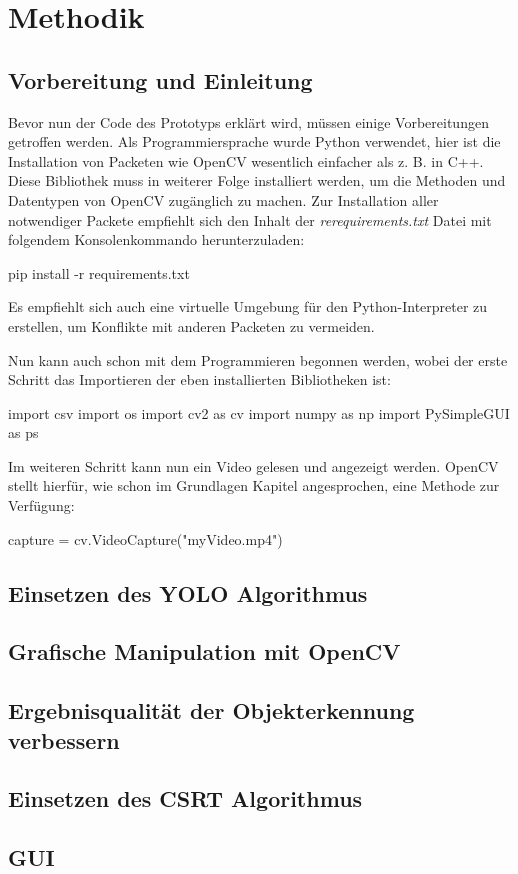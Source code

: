 \chapter{Methodik}
\label{cha:Methodik}

\section{Vorbereitung und Einleitung}
Bevor nun der Code des Prototyps erklärt wird, müssen einige Vorbereitungen getroffen werden. Als Programmiersprache wurde Python verwendet, hier ist die Installation von Packeten wie OpenCV wesentlich einfacher als z. B. in C++. Diese Bibliothek muss in weiterer Folge installiert werden, um die Methoden und Datentypen von OpenCV zugänglich zu machen. Zur Installation aller notwendiger Packete empfiehlt sich den Inhalt der \textit{rerequirements.txt} Datei mit folgendem Konsolenkommando herunterzuladen:
\vspace{\baselineskip}
\begin{PythonCode}[numbers=none]
    pip install -r requirements.txt
\end{PythonCode}
\vspace{\baselineskip}
Es empfiehlt sich auch eine virtuelle Umgebung für den Python-Interpreter zu erstellen, um Konflikte mit anderen Packeten zu vermeiden.\par
Nun kann auch schon mit dem Programmieren begonnen werden, wobei der erste Schritt das Importieren der eben installierten Bibliotheken ist:
\vspace{\baselineskip}
\begin{PythonCode}[numbers=none]
    import csv
    import os
    import cv2 as cv
    import numpy as np
    import PySimpleGUI as ps
\end{PythonCode}
\vspace{\baselineskip}
Im weiteren Schritt kann nun ein Video gelesen und angezeigt werden. OpenCV stellt hierfür, wie schon im Grundlagen Kapitel angesprochen, eine Methode zur Verfügung:
\vspace{\baselineskip}
\begin{PythonCode}[numbers=none]
    capture = cv.VideoCapture("myVideo.mp4")
\end{PythonCode}
\vspace{\baselineskip}

\section{Einsetzen des YOLO Algorithmus}



\section{Grafische Manipulation mit OpenCV}
\section{Ergebnisqualität der Objekterkennung verbessern}
\section{Einsetzen des CSRT Algorithmus}
\section{GUI}